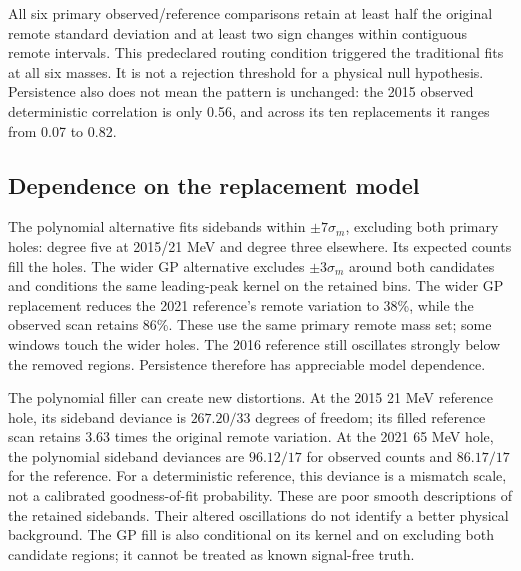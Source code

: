 All six primary observed/reference comparisons retain at least half the original remote standard deviation and at least two sign changes within contiguous remote intervals. This predeclared routing condition triggered the traditional fits at all six masses. It is not a rejection threshold for a physical null hypothesis. Persistence also does not mean the pattern is unchanged: the 2015 observed deterministic correlation is only 0.56, and across its ten replacements it ranges from 0.07 to 0.82.

\clearpage
\subsection*{Dependence on the replacement model}
The polynomial alternative fits sidebands within $\pm7\sigma_m$, excluding both primary holes: degree five at 2015/21 MeV and degree three elsewhere. Its expected counts fill the holes. The wider GP alternative excludes $\pm3\sigma_m$ around both candidates and conditions the same leading-peak kernel on the retained bins.
The wider GP replacement reduces the 2021 reference's remote variation to 38\%, while the observed scan retains 86\%. These use the same primary remote mass set; some windows touch the wider holes. The 2016 reference still oscillates strongly below the removed regions. Persistence therefore has appreciable model dependence.

The polynomial filler can create new distortions. At the 2015 21 MeV reference hole, its sideband deviance is $267.20/33$ degrees of freedom; its filled reference scan retains 3.63 times the original remote variation. At the 2021 65 MeV hole, the polynomial sideband deviances are $96.12/17$ for observed counts and $86.17/17$ for the reference. For a deterministic reference, this deviance is a mismatch scale, not a calibrated goodness-of-fit probability. These are poor smooth descriptions of the retained sidebands. Their altered oscillations do not identify a better physical background. The GP fill is also conditional on its kernel and on excluding both candidate regions; it cannot be treated as known signal-free truth.

